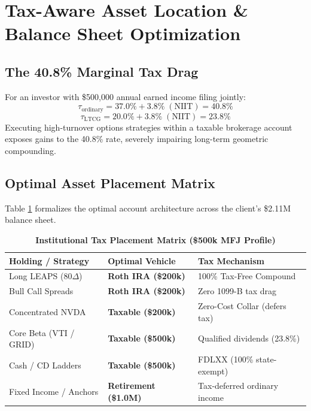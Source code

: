 \documentclass[11pt]{article}
\begin{document}
\section{Tax-Aware Asset Location \& Balance Sheet Optimization}

\subsection{The 40.8\% Marginal Tax Drag}

For an investor with \$500,000 annual earned income filing jointly:
\begin{equation}
    \tau_{\text{ordinary}} = 37.0\% + 3.8\% \; (\text{NIIT}) = 40.8\%
\end{equation}
\begin{equation}
    \tau_{\text{LTCG}} = 20.0\% + 3.8\% \; (\text{NIIT}) = 23.8\%
\end{equation}
Executing high-turnover options strategies within a taxable brokerage account exposes gains to the 40.8\% rate, severely impairing long-term geometric compounding.

\subsection{Optimal Asset Placement Matrix}

Table \ref{tab:tax_matrix} formalizes the optimal account architecture across the client's \$2.11M balance sheet.

\begin{table}[h]
\centering
\small
\caption{\textbf{Institutional Tax Placement Matrix (\$500k MFJ Profile)}}
\label{tab:tax_matrix}
\begin{tabularx}{\columnwidth}{@{}l l X@{}}
\toprule
\textbf{Holding / Strategy} & \textbf{Optimal Vehicle} & \textbf{Tax Mechanism} \\
\midrule
Long LEAPS (80$\Delta$) & \textbf{Roth IRA (\$200k)} & 100\% Tax-Free Compound \\
Bull Call Spreads & \textbf{Roth IRA (\$200k)} & Zero 1099-B tax drag \\
Concentrated NVDA & \textbf{Taxable (\$200k)} & Zero-Cost Collar (defers tax) \\
Core Beta (VTI / GRID) & \textbf{Taxable (\$500k)} & Qualified dividends (23.8\%) \\
Cash / CD Ladders & \textbf{Taxable (\$500k)} & FDLXX (100\% state-exempt) \\
Fixed Income / Anchors & \textbf{Retirement (\$1.0M)} & Tax-deferred ordinary income \\
\bottomrule
\end{tabularx}
\end{table}
\end{document}
